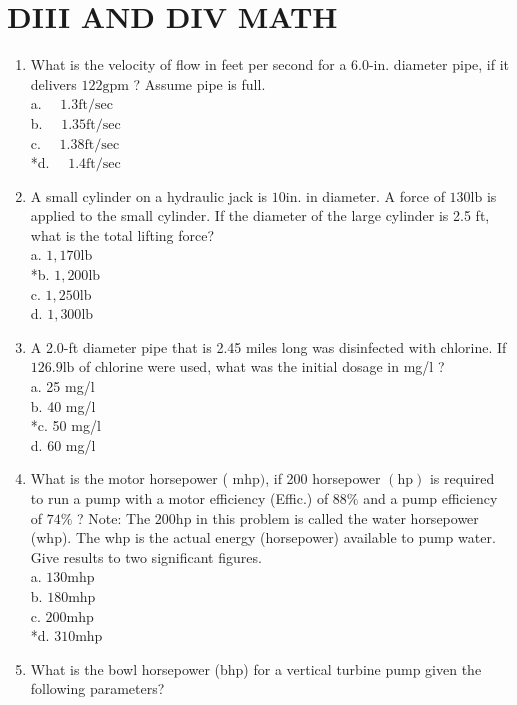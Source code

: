 \section{DIII AND DIV MATH}
\begin{enumerate}
\item What is the velocity of flow in feet per second for a 6.0-in. diameter pipe, if it delivers $122 \mathrm{gpm}$ ? Assume pipe is full.\\
a. $\quad 1.3 \mathrm{ft} / \mathrm{sec}$\\
b. $\quad 1.35 \mathrm{ft} / \mathrm{sec}$\\
c. $\quad 1.38 \mathrm{ft} / \mathrm{sec}$\\
*d. $\quad 1.4 \mathrm{ft} / \mathrm{sec}$\\
\item A small cylinder on a hydraulic jack is $10 \mathrm{in}$. in diameter. A force of $130 \mathrm{lb}$ is applied to the small cylinder. If the diameter of the large cylinder is 2.5 ft, what is the total lifting force?\\
a. $1,170 \mathrm{lb}$\\
*b. $1,200 \mathrm{lb}$\\
c. $1,250 \mathrm{lb}$\\
d. $1,300 \mathrm{lb}$\\
\item A 2.0-ft diameter pipe that is 2.45 miles long was disinfected with chlorine. If $126.9 \mathrm{lb}$ of chlorine were used, what was the initial dosage in mg/l ?\\
a. 25 mg/l\\
b. 40 mg/l\\
*c. 50 mg/l\\
d. 60 mg/l\\
\item What is the motor horsepower ( $\mathrm{mhp})$, if 200 horsepower $(\mathrm{hp})$ is required to run a pump with a motor efficiency (Effic.) of $88 \%$ and a pump efficiency of $74 \%$ ? Note: The $200 \mathrm{hp}$ in this problem is called the water horsepower (whp). The whp is the actual energy (horsepower) available to pump water. Give results to two significant figures.\\
a. $130 \mathrm{mhp}$\\
b. $180 \mathrm{mhp}$\\
c. $200 \mathrm{mhp}$\\
*d. $310 \mathrm{mhp}$\\
\item What is the bowl horsepower (bhp) for a vertical turbine pump given the following parameters?\\

\end{enumerate}
